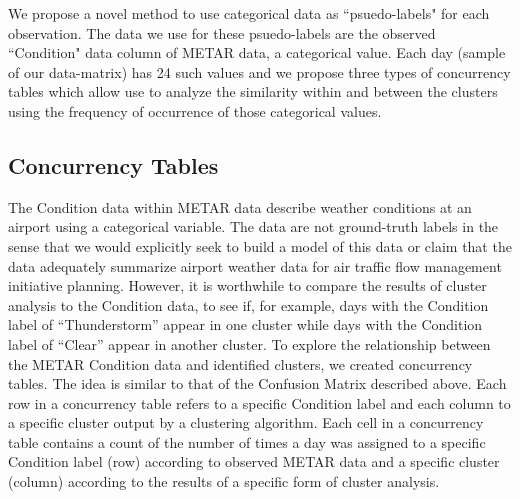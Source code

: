 \documentclass[11pt]{scrartcl}
\begin{document}
We propose a novel method to use categorical data as ``psuedo-labels" for each observation.  The data we use for these psuedo-labels are the observed ``Condition" data column of METAR data, a categorical value.  Each day (sample of our data-matrix) has 24 such values and we propose three types of concurrency tables which allow use to analyze the similarity within and between the clusters using the frequency of occurrence of those categorical values.
\subsection*{Concurrency Tables}
The Condition data within METAR data describe weather conditions at an airport using a categorical variable.  The data are not ground-truth labels in the sense that we would explicitly seek to build a model of this data or claim that the data adequately summarize airport weather data for air traffic flow management initiative planning.  However, it is worthwhile to compare the results of cluster analysis to the Condition data, to see if, for example, days with the Condition label of ``Thunderstorm'' appear in one cluster while days with the Condition label of ``Clear'' appear in another cluster.  To explore the relationship between the METAR Condition data and identified clusters, we created concurrency tables.  The idea is similar to that of the Confusion Matrix described above.  Each row in a concurrency table refers to a specific Condition label and each column to a specific cluster output by a clustering algorithm.  Each cell in a concurrency table contains a count of the number of times a day was assigned to a specific Condition label (row) according to observed METAR data and a specific cluster (column) according to the results of a specific form of cluster analysis.

\end{document}
